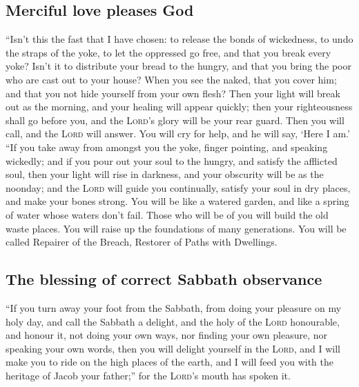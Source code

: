 \hypertarget{merciful-love-pleases-god}{%
\subsection{Merciful love pleases God}\label{merciful-love-pleases-god}}

 ``Isn't this the fast that I have chosen: to release the
bonds of wickedness, to undo the straps of the yoke, to let the
oppressed go free, and that you break every yoke?  Isn't
it to distribute your bread to the hungry, and that you bring the poor
who are cast out to your house? When you see the naked, that you cover
him; and that you not hide yourself from your own flesh? 
Then your light will break out as the morning, and your healing will
appear quickly; then your righteousness shall go before you, and the
\textsc{Lord}'s glory will be your rear guard.  Then you
will call, and the \textsc{Lord} will answer. You will cry for help, and
he will say, `Here I am.' ``If you take away from amongst you the yoke,
finger pointing, and speaking wickedly;  and if you pour
out your soul to the hungry, and satisfy the afflicted soul, then your
light will rise in darkness, and your obscurity will be as the noonday;
 and the \textsc{Lord} will guide you continually,
satisfy your soul in dry places, and make your bones strong. You will be
like a watered garden, and like a spring of water whose waters don't
fail.  Those who will be of you will build the old waste
places. You will raise up the foundations of many generations. You will
be called Repairer of the Breach, Restorer of Paths with Dwellings.

\hypertarget{the-blessing-of-correct-sabbath-observance}{%
\subsection{The blessing of correct Sabbath
observance}\label{the-blessing-of-correct-sabbath-observance}}

 ``If you turn away your foot from the Sabbath, from
doing your pleasure on my holy day, and call the Sabbath a delight, and
the holy of the \textsc{Lord} honourable, and honour it, not doing your
own ways, nor finding your own pleasure, nor speaking your own words,
 then you will delight yourself in the \textsc{Lord}, and
I will make you to ride on the high places of the earth, and I will feed
you with the heritage of Jacob your father;'' for the \textsc{Lord}'s
mouth has spoken it.

